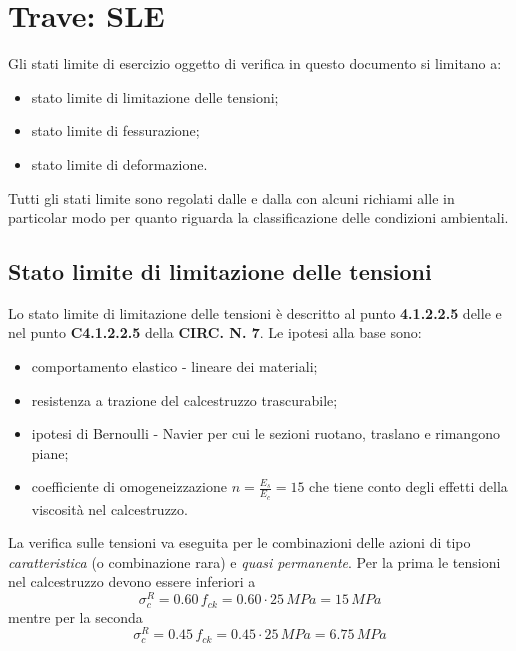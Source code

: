 \chapter{Trave: SLE}\label{chap:traveSLE}

Gli stati limite di esercizio oggetto di verifica in questo documento si limitano a:
\begin{itemize}
	\item stato limite di limitazione delle tensioni;
	\item stato limite di fessurazione;
	\item stato limite di deformazione.
\end{itemize}

Tutti gli stati limite sono regolati dalle \ntc e dalla \circolare con alcuni richiami alle \ec in particolar modo per quanto riguarda la classificazione delle condizioni ambientali.

\section{Stato limite di limitazione delle tensioni}\label{sec:SLE_tensioni}
Lo stato limite di limitazione delle tensioni è descritto al punto \textbf{4.1.2.2.5} delle \ntc e nel punto \textbf{C4.1.2.2.5} della \textbf{CIRC. N. 7}. Le ipotesi alla base sono:
\begin{itemize}
	\item comportamento elastico - lineare dei materiali;
	\item resistenza a trazione del calcestruzzo trascurabile;
	\item ipotesi di Bernoulli - Navier per cui le sezioni ruotano, traslano e rimangono piane;
	\item coefficiente di omogeneizzazione $n = \frac{E_s}{E_c} = 15$ che tiene conto degli effetti della viscosità nel calcestruzzo.
\end{itemize}

La verifica sulle tensioni va eseguita per le combinazioni delle azioni di tipo \textit{caratteristica} (o combinazione rara) e \textit{quasi permanente}. Per la prima le tensioni nel calcestruzzo devono essere inferiori a
\begin{equation}
	\label{eq:sigma_c_riferimento_rara}
	\sigma_c^R = 0.60\,f_{ck} = 0.60\cdot 25\,MPa = 15\,MPa
\end{equation}
mentre per la seconda 
\begin{equation}
	\label{eq:sigma_c_riferimento_rara}
	\sigma_c^R = 0.45\,f_{ck} = 0.45\cdot 25\,MPa = 6.75\,MPa
\end{equation}

